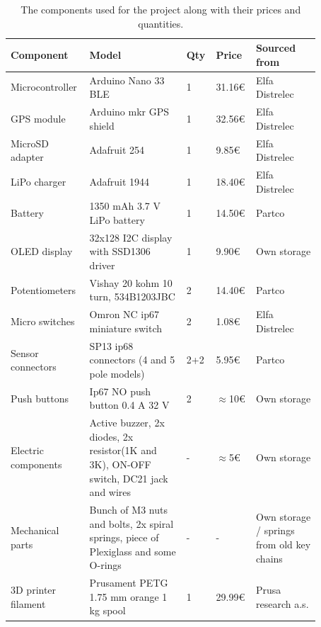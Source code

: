 \documentclass[a4paper,11pt]{article} %
\begin{document}
\begin{table}[H]
    \caption{The components used for the project along with their prices and quantities.}
    \centering
    \begin{tabular}{ |p{0.2\linewidth} | p{0.3\linewidth}| p{0.07\linewidth}| p{0.1\linewidth}| p{0.2\linewidth}| } 
     \hline
     Component & Model & Qty & Price & Sourced from \\ 
     \hline
     \hline
     Microcontroller &	Arduino Nano 33 BLE &	1 &	31.16€ &	Elfa Distrelec\\
     \hline
     GPS module &	Arduino mkr GPS shield &	1 &	32.56€ &	Elfa Distrelec\\
     \hline
     MicroSD adapter &	Adafruit 254 &	1 &	9.85€ &	Elfa Distrelec\\
     \hline
     LiPo charger &	Adafruit 1944 &	1 &	18.40€ &	Elfa Distrelec\\
     \hline
     Battery &	1350 mAh 3.7 V LiPo battery &	1 &	14.50€ &	Partco\\
     \hline
     OLED display &	32x128 I2C display with SSD1306 driver &	1 &	9.90€ &	Own storage\\
     \hline
     Potentiometers &	Vishay 20 kohm 10 turn, 534B1203JBC &	2 &	14.40€ &	Partco\\
     \hline
     Micro switches &	Omron NC ip67 miniature switch &	2 &	1.08€ &	Elfa Distrelec\\
     \hline
     Sensor connectors &	SP13 ip68 connectors (4 and 5 pole models) &	2+2	& 5.95€ &	Partco\\
     \hline
     Push buttons &	Ip67 NO push button 0.4 A 32 V &	2 &	$\approx$10€ &	Own storage\\
     \hline
     Electric components & Active buzzer, 2x diodes, 2x resistor(1K and 3K), ON-OFF switch, DC21 jack and wires & - & $\approx$5€ &	Own storage\\
     \hline
     Mechanical parts & Bunch of M3 nuts and bolts, 2x spiral springs, piece of Plexiglass and some O-rings & - & - & Own storage / springs from old key chains\\
     \hline
     3D printer filament &	Prusament PETG 1.75 mm orange 1 kg spool &	1 &	29.99€ &	Prusa research a.s.\\
     \hline
    \end{tabular}
    \label{tab:components}
\end{table}
\end{document}
